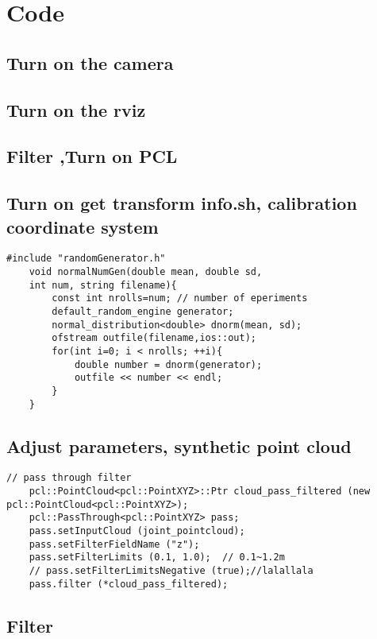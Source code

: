 \chapter{Code}
\section{Turn on the camera}
\section{Turn on the rviz}
\section{Filter ,Turn on PCL}
\section{Turn on get transform info.sh, calibration coordinate system}

\begin{lstlisting}[caption={}]
	#include "randomGenerator.h"
	void normalNumGen(double mean, double sd,
	int num, string filename){
		const int nrolls=num; // number of eperiments
		default_random_engine generator;
		normal_distribution<double> dnorm(mean, sd);
		ofstream outfile(filename,ios::out);
		for(int i=0; i < nrolls; ++i){
			double number = dnorm(generator);
			outfile << number << endl;
		}
	}
\end{lstlisting}
\section{Adjust parameters, synthetic point cloud}

\begin{lstlisting}[caption={}]
	// pass through filter
	pcl::PointCloud<pcl::PointXYZ>::Ptr cloud_pass_filtered (new pcl::PointCloud<pcl::PointXYZ>);
	pcl::PassThrough<pcl::PointXYZ> pass;
	pass.setInputCloud (joint_pointcloud);
	pass.setFilterFieldName ("z");
	pass.setFilterLimits (0.1, 1.0);  // 0.1~1.2m 
	// pass.setFilterLimitsNegative (true);//lalallala
	pass.filter (*cloud_pass_filtered); 
\end{lstlisting}
\section{Filter}
